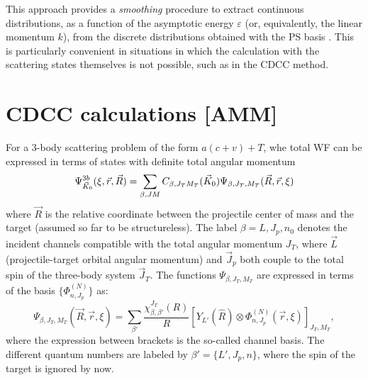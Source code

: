 \documentclass[preprint,12pt]{elsarticle}
\begin{document}
This approach provides a {\it smoothing} procedure  to extract
continuous distributions, as a function of the asymptotic energy
$\varepsilon$ (or, equivalently,  
the linear momentum $k$), from the discrete distributions obtained
with the PS basis \cite{Mor06,Mor09}.  This is particularly convenient  
in situations in which the calculation with the scattering states
themselves is not possible, such as in the CDCC method.   

\section{CDCC calculations [AMM]}
For a 3-body scattering problem of the form $a(c+v) +T$, whe total WF can be expressed in terms of states with definite total angular momentum 
\begin{equation}
\label{eq:cdccwf}
\Psi^{3b}_{\vec{K}_0}(\xi,{\vec r},{\vec R})= \sum_{\beta,JM} C_{\beta,J_T M_T}(\vec{K}_0) \Psi_{\beta,J_T, M_T}(\vec{R},\vec{r},\xi)
\end{equation}
where  $\vec{R}$ is  the relative coordinate between the projectile
center of mass and the target (assumed so far to be structureless). The label $\beta={L, J_p, n_0}$ denotes the incident channels compatible with the total angular momentum $J_T$, where $\vec{L}$ (projectile-target orbital angular momentum) and 
$\vec{J}_p$ both couple to the total spin of the three-body system $\vec{J}_T$.
The functions  $\Psi_{\beta,J_T, M_T}$ are expressed in terms of the  basis $\{\Phi^{(N)}_{n,J_p}\}$ as:
\begin{equation}
\Psi_{\beta,J_T, M_T}(\vec{R},\vec{r},\xi)=\sum_{\beta'}
\frac{\chi_{\beta,\beta'}^{J_T}(R)}{R}  \left[Y_{L'}({\hat{R}})\otimes\Phi^{(N)}_{n,J_p}(\vec{r},\xi)\right]_{J_T,M_T},   
\label{f3b}
\end{equation}
where the expression between brackets is the so-called channel basis. 
The different quantum numbers are labeled by $\beta'=\{L', J_p, n\}$,
where  the spin of the
target is ignored by now.  
\end{document}
